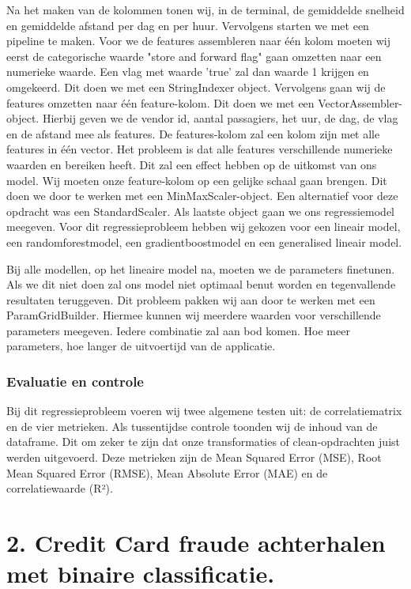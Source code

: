 \documentclass[a4paper,12pt,twoside]{report}
\begin{document}
Na het maken van de kolommen tonen wij, in de terminal, de gemiddelde snelheid en gemiddelde afstand per dag en per huur. Vervolgens starten we met een pipeline te maken. Voor we de features assembleren naar één kolom moeten wij eerst de categorische waarde "store and forward flag" gaan omzetten naar een numerieke waarde. Een vlag met waarde 'true' zal dan waarde 1 krijgen en omgekeerd. Dit doen we met een StringIndexer object. Vervolgens gaan wij de features omzetten naar één feature-kolom. Dit doen we met een VectorAssembler-object. Hierbij geven we de vendor id, aantal passagiers, het uur, de dag, de vlag en de afstand mee als features. De features-kolom zal een kolom zijn met alle features in één vector. Het probleem is dat alle features verschillende numerieke waarden en bereiken heeft. Dit zal een effect hebben op de uitkomst van ons model. Wij moeten onze feature-kolom op een gelijke schaal gaan brengen. Dit doen we door te werken met een MinMaxScaler-object. Een alternatief voor deze opdracht was een StandardScaler. Als laatste object gaan we ons regressiemodel meegeven. Voor dit regressieprobleem hebben wij gekozen voor een lineair model, een randomforestmodel, een gradientboostmodel en een generalised lineair model.

Bij alle modellen, op het lineaire model na, moeten we de parameters finetunen. Als we dit niet doen zal ons model niet optimaal benut worden en tegenvallende resultaten teruggeven. Dit probleem pakken wij aan door te werken met een ParamGridBuilder. Hiermee kunnen wij meerdere waarden voor verschillende parameters meegeven. Iedere combinatie zal aan bod komen. Hoe meer parameters, hoe langer de uitvoertijd van de applicatie.

\subsection*{Evaluatie en controle}

Bij dit regressieprobleem voeren wij twee algemene testen uit: de correlatiematrix en de vier metrieken. Als tussentijdse controle toonden wij de inhoud van de dataframe. Dit om zeker te zijn dat onze transformaties of clean-opdrachten juist werden uitgevoerd. Deze metrieken zijn de Mean Squared Error (MSE), Root Mean Squared Error (RMSE), Mean Absolute Error (MAE) en de correlatiewaarde (R²).

\chapter*{2. Credit Card fraude achterhalen met binaire classificatie. }
\end{document}
